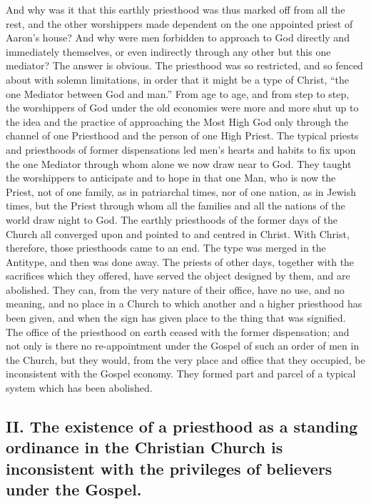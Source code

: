 \documentclass[]{book}
\begin{document}
And why was it that this earthly priesthood was thus marked off from all the rest, and the other worshippers made dependent on the one appointed priest of Aaron's house? And why were men forbidden to approach to God directly and immediately themselves, or even indirectly through any other but this one mediator? The answer is obvious. The priesthood was so restricted, and so fenced about with solemn limitations, in order that it might be a type of Christ, ``the one Mediator between God and man.'' From age to age, and from step to step, the worshippers of God under the old economies were more and more shut up to the idea and the practice of approaching the Most High God only through the channel of one Priesthood and the person of one High Priest. The typical priests and priesthoods of former dispensations led men's hearts and habits to fix upon the one Mediator through whom alone we now draw near to God. They taught the worshippers to anticipate and to hope in that one Man, who is now the Priest, not of one family, as in patriarchal times, nor of one nation, as in Jewish times, but the Priest through whom all the families and all the nations of the world draw night to God. The earthly priesthoods of the former days of the Church all converged upon and pointed to and centred in Christ. With Christ, therefore, those priesthoods came to an end. The type was merged in the Antitype, and then was done away. The priests of other days, together with the sacrifices which they offered, have served the object designed by them, and are abolished. They can, from the very nature of their office, have no use, and no meaning, and no place in a Church to which another and a higher priesthood has been given, and when the sign has given place to the thing that was signified. The office of the priesthood on earth ceased with the former dispensation; and not only is there no re-appointment under the Gospel of such an order of men in the Church, but they would, from the very place and office that they occupied, be inconsistent with the Gospel economy. They formed part and parcel of a typical system which has been abolished.

\hypertarget{ii.-the-existence-of-a-priesthood-as-a-standing-ordinance-in-the-christian-church-is-inconsistent-with-the-privileges-of-believers-under-the-gospel.}{%
\subsection{II. The existence of a priesthood as a standing ordinance in the Christian Church is inconsistent with the privileges of believers under the Gospel.}\label{ii.-the-existence-of-a-priesthood-as-a-standing-ordinance-in-the-christian-church-is-inconsistent-with-the-privileges-of-believers-under-the-gospel.}}
\end{document}
